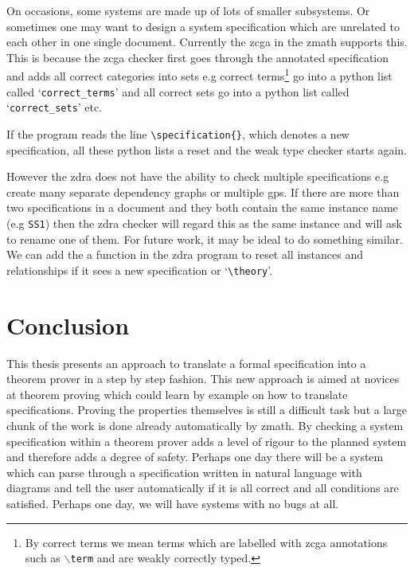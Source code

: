 On occasions, some systems are made up of lots of smaller subsystems. Or
sometimes one may want to design a system specification which are unrelated to
each other in one single document. Currently the \gls{zcga} in the \gls{zmath}
supports this. This is because the \gls{zcga} checker first goes through the
annotated specification and adds all correct categories into sets e.g correct
terms\footnote{By correct terms we mean terms which are labelled with \gls{zcga}
annotations such as $\backslash$\texttt{term} and are weakly correctly typed.}
go into a python list called `\texttt{correct\_terms}' and all correct sets go
into a python list called `\texttt{correct\_sets}' etc. 


If the program reads the line \verb|\specification{}|, which denotes a new
specification, all these python lists a reset and the weak type checker starts
again.

However the \gls{zdra} does not have the ability to check multiple
specifications e.g create many separate dependency graphs or multiple \gls{gps}.
If there are more than two specifications in a document and they both contain
the same instance name (e.g \texttt{SS1}) then the \gls{zdra} checker will
regard this as the same instance and will ask to rename one of them. For future
work, it may be ideal to do something similar. We can add the a function in the
\gls{zdra} program to reset all instances and relationships if it sees a new
specification or `\verb|\theory|'.

\section{Conclusion}
\label{sec:conclusion}

This thesis presents an approach to translate a formal specification into a
theorem prover in a step by step fashion. This new approach is aimed at novices
at theorem proving which could learn by example on how to translate
specifications. Proving the properties themselves is still a difficult task but
a large chunk of the work is done already automatically by \gls{zmath}. By
checking a system specification within a theorem prover adds a level of rigour
to the planned system and therefore adds a degree of safety. Perhaps one day
there will be a system which can parse through a specification written in
natural language with diagrams and tell the user automatically if it is all
correct and all conditions are satisfied. Perhaps one day, we will have systems
with no bugs at all.